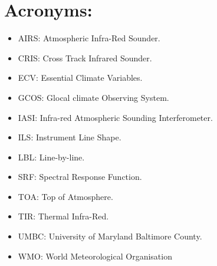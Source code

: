 \documentclass[twocolumn,10pt]{article}
\begin{document}
\section{Acronyms:}
\label{sec:orgheadline15}
\begin{itemize}
\item AIRS: Atmospheric Infra-Red Sounder.
\item CRIS: Cross Track Infrared Sounder.
\item ECV: Essential Climate Variables.
\item GCOS: Glocal climate Observing System.
\item IASI: Infra-red Atmospheric Sounding Interferometer.
\item ILS: Instrument Line Shape.
\item LBL: Line-by-line.
\item SRF: Spectral Response Function.
\item TOA: Top of Atmosphere.
\item TIR: Thermal Infra-Red.
\item UMBC: University of Maryland Baltimore County.
\item WMO: World Meteorological Organisation
\end{itemize}

\end{document}
